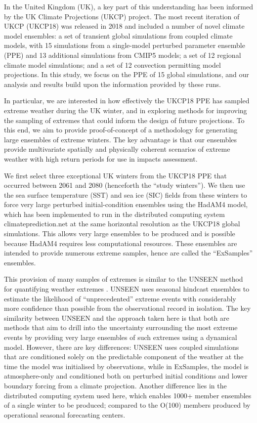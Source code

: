   In the United Kingdom (UK), a key part of this understanding has been informed by the UK Climate Projections (UKCP) project. The most recent iteration of UKCP (UKCP18) was released in 2018 \citep{lowe_ukcp18_2018,murphy_ukcp18_2018} and included a number of novel climate model ensembles: a set of transient global simulations from coupled climate models, with 15 simulations from a single-model perturbed parameter ensemble (PPE) and 13 additional simulations from CMIP5 models; a set of 12 regional climate model simulations; and a set of 12 convection permitting model projections. In this study, we focus on the PPE of 15 global simulations, and our analysis and results build upon the information provided by these runs.

  In particular, we are interested in how effectively the UKCP18 PPE has sampled extreme weather during the UK winter, and in exploring methods for improving the sampling of extremes that could inform the design of future projections. To this end, we aim to provide proof-of-concept of a methodology for generating large ensembles of extreme winters. The key advantage is that our ensembles provide multivariate spatially and physically coherent scenarios of extreme weather with high return periods for use in impacts assessment.

  We first select three exceptional UK winters from the UKCP18 PPE that occurred between 2061 and 2080 (henceforth the ``study winters''). We then use the sea surface temperature (SST) and sea ice (SIC) fields from these winters to force very large perturbed initial-condition ensembles using the HadAM4 model, which has been implemented to run in the distributed computing system climateprediction.net at the same horizontal resolution as the UKCP18 global simulations. This allows very large ensembles to be produced and is possible because HadAM4 requires less computational resources. These ensembles are intended to provide numerous extreme samples, hence are called the ``ExSamples'' ensembles.

  This provision of many samples of extremes is similar to the UNSEEN method for quantifying weather extremes \citep{kelder_using_2020,thompson_high_2017}. UNSEEN uses seasonal hindcast ensembles to estimate the likelihood of ``unprecedented'' extreme events with considerably more confidence than possible from the observational record in isolation. The key similarity between UNSEEN and the approach taken here is that both are methods that aim to drill into the uncertainty surrounding the most extreme events by providing very large ensembles of such extremes using a dynamical model. However, there are key differences: UNSEEN uses coupled simulations that are conditioned solely on the predictable component of the weather at the time the model was initialised by observations, while in ExSamples, the model is atmosphere-only and conditioned both on perturbed initial conditions and lower boundary forcing from a climate projection. Another difference lies in the distributed computing system used here, which enables 1000+ member ensembles of a single winter to be produced; compared to the O(100) members produced by operational seasonal forecasting centers.

